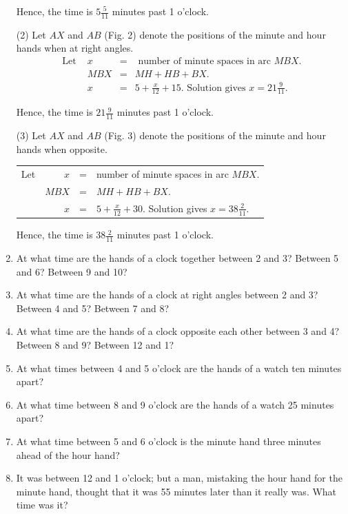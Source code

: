 \documentclass{book}
\begin{document}
\begin{enumerate}
Hence, the time is $5\frac{5}{11}$ minutes past 1 o'clock.

(2) Let $AX$ and $AB$ (Fig. 2) denote the positions of
the minute and hour hands when at right angles.
\[
\begin{array}{rrcl}
\text{Let } & x &=& \text{ number of minute spaces in arc } MBX.  \\
 & MBX &=& MH + HB + BX.   \\
&x &=&5 + \frac{x}{12} + 15.\text{ Solution gives } x=21\frac{9}{11}.
\end{array}
\]

Hence, the time is $21\frac{9}{11}$ minutes past 1 o'clock.

(3) Let $AX$ and $AB$ (Fig. 3) denote the positions of
the minute and hour hands when opposite.


\begin{tabular}{rrcl}
Let &  $x$ &=& number of minute spaces in arc $MBX$.   \\
    &$MBX$ &=& $MH +HB + BX.$   \\
    &  $x$ &=& $5+\frac{x}{12}+30$. Solution gives $x=38\frac{2}{11}$.
\end{tabular}


Hence, the time is $38\frac{2}{11}$ minutes past 1 o'clock.

\item At what time are the hands of a clock together
between 2 and 3? Between 5 and 6? Between 9 and 10?

\item At what time are the hands of a clock at right
angles between 2 and 3? Between 4 and 5? Between 7
and 8?

\item At what time are the hands of a clock opposite each
other between 3 and 4? Between 8 and 9? Between 12
and 1?

\item At what times between 4 and 5 o'clock are the hands
of a watch ten minutes apart?

\item At what time between 8 and 9 o'clock are the
hands of a watch 25 minutes apart?

\item At what time between 5 and 6 o'clock is the minute
hand three minutes ahead of the hour hand?

\item It was between 12 and 1 o'clock; but a man, mistaking
the hour hand for the minute hand, thought that
it was 55 minutes later than it really was. What time
was it?


\end{enumerate}
\end{document}
